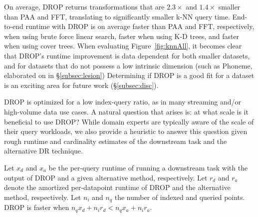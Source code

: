 On average, DROP returns transformations that are $2.3\times$ and  $1.4\times$ smaller than PAA and FFT, translating to significantly smaller k-NN query time. 
End-to-end runtime with DROP is on average  faster than PAA and FFT, respectively, when using brute force linear search,    faster when using K-D trees, and  faster when using cover trees.
When evaluating Figure~\ref{fig:knnAll}, it becomes clear that DROP's runtime improvement is data dependent for both smaller datasets, and for datasets that do not possess a low intrinsic dimension (such as Phoneme, elaborated on in \S\ref{subsec:lesion})
Determining if DROP is a good fit for a dataset is an exciting area for future work (\S\ref{subsec:disc}).




DROP is optimized for a low index-query ratio, as in many streaming and/or high-volume data use cases.
A natural question that arises is: at what scale is it beneficial to use DROP?
While domain experts are typically aware of the scale of their query workloads, we also provide a heuristic to answer this question given rough runtime and cardinality estimates of the downstream task and the alternative DR technique.

Let $x_d$ and $x_a$ be the per-query runtime of running a downstream task with the output of DROP and a given alternative method, respectively. 
Let $r_d$ and $r_a$ denote the amortized per-datapoint runtime of DROP and the alternative method, respectively. 
Let $n_i$ and $n_q$ the number of indexed and queried points. 
DROP is faster when $n_q x_d + n_i r_d < n_q x_a + n_i r_a$.

